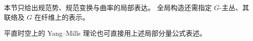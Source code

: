 \begin{remark}
    本节只给出规范势、规范变换与曲率的局部表达。
    全局构造还需指定 $G$-主丛、其联络及 $G$ 在纤维上的表示。
\end{remark}

\begin{remark}
    平直时空上的 Yang--Mills 理论也可直接用上述局部分量公式表述。
\end{remark}

